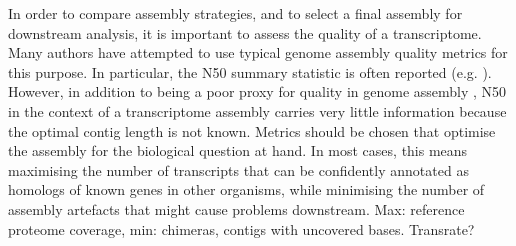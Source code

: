 In order to compare assembly strategies, and to select a final assembly for downstream analysis, it is important to assess the quality of a transcriptome. Many authors have attempted to use typical genome assembly quality metrics for this purpose. In particular, the N50 summary statistic is often reported (e.g. \citep{Hiz:2014ep,Shinzato:2014hx,Liang:2013fm}). However, in addition to being a poor proxy for quality in genome assembly \citep{Bradnam:2013uua}, N50 in the context of a transcriptome assembly carries very little information because the optimal contig length is not known. Metrics should be chosen that optimise the assembly for the biological question at hand. In most cases, this means maximising the number of transcripts that can be confidently annotated as homologs of known genes in other organisms, while minimising the number of assembly artefacts that might cause problems downstream. Max: reference proteome coverage, min: chimeras, contigs with uncovered bases. Transrate?

